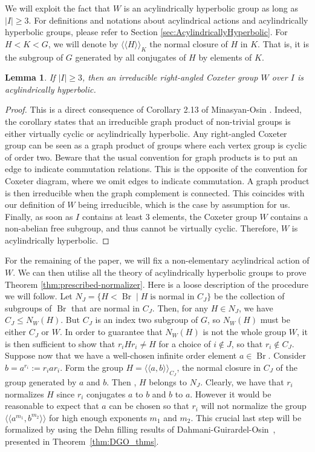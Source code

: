 \documentclass[11pt,letterpaper]{amsart}
\newtheorem{lemma}[prop]{Lemma}
\newcommand{\Br}{\operatorname{Br}}
\begin{document}
We will exploit the fact that $W$ is an acylindrically hyperbolic group as long as $|I| \geq 3$. For definitions and notations about acylindrical actions and acylindrically hyperbolic groups, please refer to Section \ref{sec:AcylindricallyHyperbolic}. For $H < K < G$, we will denote by $\langle\langle H \rangle\rangle_K$ the normal closure of $H$ in $K$. That is, it is the subgroup of $G$ generated by all conjugates of $H$ by elements of $K$.


\begin{lemma}
    If $|I| \geq 3$, then an irreducible right-angled Coxeter group $W$ over $I$ is acylindrically hyperbolic.
\end{lemma}
\begin{proof}
This is a direct consequence of Corollary 2.13 of Minasyan-Osin \cite{minasyan2013acylindrically}. Indeed, the corollary states that an irreducible graph product of non-trivial groups is either virtually cyclic or acylindrically hyperbolic. Any right-angled Coxeter group can be seen as a graph product of groups where each vertex group is cyclic of order two. Beware that the usual convention for graph products is to put an edge to indicate commutation relations. This is the opposite of the convention for Coxeter diagram, where we omit edges to indicate commutation. A graph product is then irreducible when the graph complement is connected. This coincides with our definition of $W$ being irreducible, which is the case by assumption for us. Finally, as soon as $I$ contains at least $3$ elements, the Coxeter group $W$ contains a non-abelian free subgroup, and thus cannot be virtually cyclic. Therefore, $W$ is acylindrically hyperbolic.
\end{proof}

For the remaining of the paper, we will fix a non-elementary acylindrical action of $W$.
We can then utilise all the theory of acylindrically hyperbolic groups to prove Theorem \ref{thm:prescribed-normalizer}. Here is a loose description of the procedure we will follow. Let $N_J = \{H < \Br \mid H \; \text{is normal in } C_J\}$ be the collection of subgroups of $\Br$ that are normal in $C_J$. Then, for any $H \in N_J$, we have $C_J \leq N_W(H)$. But $C_J$ is an index two subgroup of $G$, so $N_W(H)$ must be either $C_J$ or $W$. In order to guarantee that $N_W(H)$ is not the whole group $W$, it is then sufficient to show that $r_i H r_i \neq H$ for a choice of $i \notin J$, so that $r_i \notin C_J$. Suppose now that we have a well-chosen infinite order element $a \in \Br$. Consider $b = a^{r_i} := r_i a r_i$. Form the group $ H =\langle\langle a,b\rangle \rangle_{C_J}$, the normal closure in $C_J$ of the group generated by $a$ and $b$. Then , $H$ belongs to $N_J$. Clearly, we have that $r_i$ normalizes $H$ since $r_i$ conjugates $a$ to $b$ and $b$ to $a$. However it would be reasonable to expect that $a$ can be chosen so that $r_i$ will not normalize the group $\langle \langle a^{m_1}, b^{m_2}\rangle \rangle$ for high enough exponents $m_1$ and $m_2$. This crucial last step will be formalized by using the Dehn filling results of Dahmani-Guirardel-Osin~\cite[Theorem 7.19]{DGO}, presented in Theorem~\ref{thm:DGO_thms}.
\end{document}
